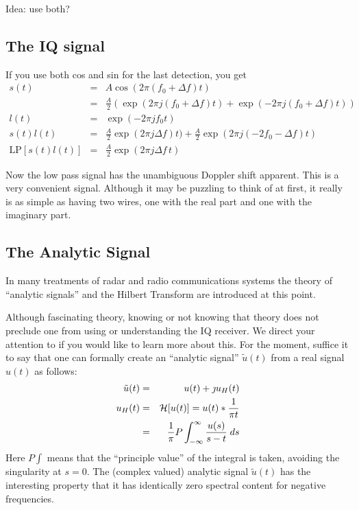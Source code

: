 Idea: use both?


\subsection{The IQ signal}

If you use both cos and sin for the last detection, you get
\begin{eqnarray}
s(t) &=& A \cos(2\pi(f_0 + \Delta f)t) \nonumber \\
 &=& \frac{A}{2}\left( \exp(2\pi j(f_0 + \Delta f)t) + \exp(-2\pi
 j(f_0 + \Delta f)t) \right) \nonumber \\
l(t) &=& \exp(-2\pi j f_0 t) \\
s(t)l(t) &=& \frac{A}{2} \exp(2\pi j\Delta f)t) + 
\frac{A}{2} \exp(2\pi j(-2f_0 - \Delta f)t) \\
\textrm{LP}[s(t)l(t)] &=& \frac{A}{2}\exp(2\pi j \Delta f \,t)
\end{eqnarray}

Now the low pass signal has the unambiguous Doppler shift apparent.
This is a very convenient signal.  Although it may be puzzling to
think of at first, it really is as simple as having two wires, one
with the real part and one with the imaginary part.

\subsection{The Analytic Signal}

In many treatments of radar and radio communications systems the
theory of ``analytic signals'' and the Hilbert Transform are
introduced at this point.  

Although fascinating theory, knowing or not knowing that theory does
not preclude one from using or understanding the IQ receiver.  We
direct your attention to \cite{whalen,vantrees} if you would like to
learn more about this.  For the moment, suffice it to say that one can
formally create an ``analytic signal'' $\tilde{u}(t)$ from a real
signal $u(t)$ as follows:
\begin{eqnarray}
\tilde{u}(t) &=& u(t) + \jmath u_H(t) \\
u_H(t) &=& {\cal H}[u(t)] = u(t) \ast \frac{1}{\pi t} \\
       &=& \frac{1}{\pi} P \int_{-\infty}^\infty \frac{u(s)}{s - t}\; ds
\end{eqnarray}
Here $P\!\!\int$ means that the ``principle value'' of the integral is
taken, avoiding the singularity at $s=0$.  The (complex valued)
analytic signal $\tilde{u}(t)$ has the interesting property that it
has identically zero spectral content for negative frequencies. 

